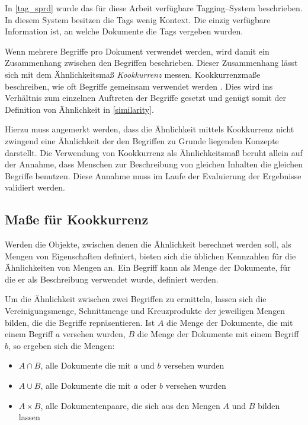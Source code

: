 In \cref{tag_sprd} wurde das für diese Arbeit verfügbare Tagging--System beschrieben. In diesem System besitzen die Tags wenig Kontext. Die einzig verfügbare Information ist, an welche Dokumente die Tags vergeben wurden.

Wenn mehrere Begriffe pro Dokument verwendet werden, wird damit ein Zusammenhang zwischen den Begriffen beschrieben. Dieser Zusammenhang lässt sich mit dem Ähnlichkeitsmaß \emph{Kookkurrenz} messen. Kookkurrenzmaße beschreiben, wie oft Begriffe gemeinsam verwendet werden \cite[S. 21]{zz2011}. Dies wird ins Verhältnis zum einzelnen Auftreten der Begriffe gesetzt und genügt somit der Definition von Ähnlichkeit in \cref{similarity}.

Hierzu muss angemerkt werden, dass die Ähnlichkeit mittels Kookkurrenz nicht zwingend eine Ähnlichkeit der den Begriffen zu Grunde liegenden Konzepte darstellt. Die Verwendung von Kookkurrenz als Ähnlichkeitsmaß beruht allein auf der Annahme, dass Menschen zur Beschreibung von gleichen Inhalten die gleichen Begriffe benutzen. Diese Annahme muss im Laufe der Evaluierung der Ergebnisse validiert werden.

\subsection{Maße für Kookkurrenz}
\label{measures}

Werden die Objekte, zwischen denen die Ähnlichkeit berechnet werden soll, als Mengen von Eigenschaften definiert, bieten sich die üblichen Kennzahlen für die Ähnlichkeiten von Mengen an. Ein Begriff kann als Menge der Dokumente, für die er als Beschreibung verwendet wurde, definiert werden.

Um die Ähnlichkeit zwischen zwei Begriffen zu ermitteln, lassen sich die Vereinigungsmenge, Schnittmenge und Kreuzprodukte der jeweiligen Mengen bilden, die die Begriffe repräsentieren. Ist \(A\) die Menge der Dokumente, die mit einem Begriff \(a\) versehen wurden, \(B\) die Menge der Dokumente mit einem Begriff \(b\), so ergeben sich die Mengen:

\begin{itemize}
    \item \(A \cap B\), alle Dokumente die mit \(a\) und \(b\) versehen wurden
    \item \(A \cup B\), alle Dokumente die mit \(a\) oder \(b\) versehen wurden
    \item \(A \times B\), alle Dokumentenpaare, die sich aus den Mengen \(A\) und \(B\) bilden lassen
\end{itemize}

